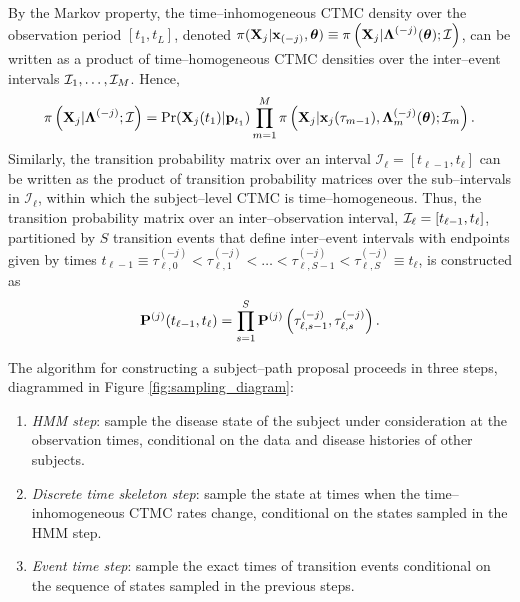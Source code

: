 By the Markov property, the time--inhomogeneous CTMC density over the observation period $ [t_1,t_L] $, denoted $ \pi(\mathbf{X}_j | \mathbf{x}_{(-j)}, \boldsymbol{\theta}) \equiv \pi\left (\mathbf{X}_j | \boldsymbol{\Lambda}^{(-j)}(\boldsymbol{\theta}); \mathcal{I}\right ) $, can be written as a product of time--homogeneous CTMC densities over the inter--event intervals $ \mathcal{I}_1,\dots,\mathcal{I}_{M} $. Hence,
\begin{equation}
\label{eqn:subj_level_dens}
\pi\left (\mathbf{X}_j | \boldsymbol{\Lambda}^{(-j)};\mathcal{I}\right ) = \Pr(\mathbf{X}_j(t_1) | \mathbf{p}_{t_1}) \prod_{m=1}^{M}\pi\left (\mathbf{X}_j  | \mathbf{x}_j(\tau_{m-1}), \boldsymbol{\Lambda}^{(-j)}_m(\boldsymbol{\theta});\mathcal{I}_m\right ).
\end{equation} 
Similarly, the transition probability matrix over an interval $ \mathcal{I}_\ell = [t_{\ell-1},t_\ell] $ can be written as the product of transition probability matrices over the sub--intervals in $ \mathcal{I}_\ell $, within which the subject--level CTMC is time--homogeneous. Thus, the transition probability matrix over an inter--observation interval, $ \mathcal{I}_\ell = [t_{\ell-1}, t_\ell] $, partitioned by $ S $ transition events that define inter--event intervals with endpoints given by times $ t_{\ell-1} \equiv \tau_{\ell,0}^{(-j)} < \tau_{\ell,1}^{(-j)}<\dots<\tau_{\ell,S-1}^{(-j)}  < \tau_{\ell,S}^{(-j)} \equiv t_\ell $, is constructed as
\begin{equation*}\label{eqn:inhomog_tpmprod} \mathbf{P}^{(j)}(t_{\ell - 1},t_\ell) = \prod_{s=1}^{S}\mathbf{P}^{(j)}\left(\tau_{\ell,s-1}^{(-j)},\tau_{\ell,s}^{(-j)}\right) .\end{equation*}

The algorithm for constructing a subject--path proposal proceeds in three steps, diagrammed in Figure \ref{fig:sampling_diagram}:  
\begin{enumerate}[nolistsep]
	\item \textit{HMM step}: sample the disease state of the subject under consideration at the observation times, conditional on the data and disease histories of other subjects.
	\item \textit{Discrete time skeleton step}: sample the state at times when the time--inhomogeneous CTMC rates change, conditional on the states sampled in the HMM step. 
	\item \textit{Event time step}: sample the exact times of transition events conditional on the sequence of states sampled in the previous steps. 
\end{enumerate}

